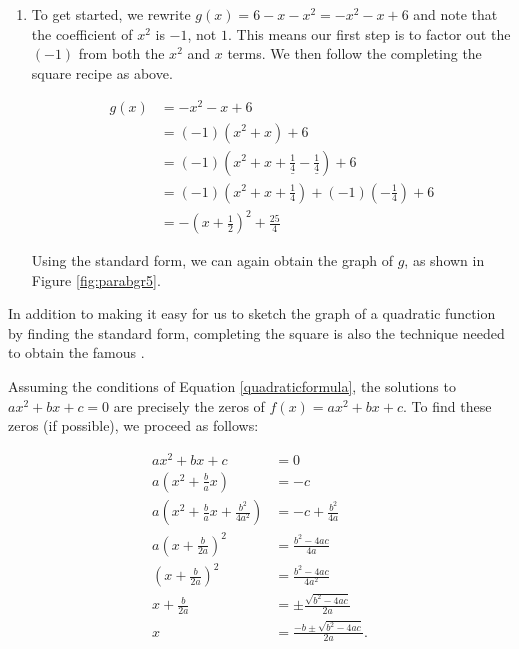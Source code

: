 {\begin{enumerate}
From the standard form we can immediately (if desired) produce a sketch of the graph of $f$,  as shown in Figure \ref{fig:parabgr4}.

\item  To get started, we rewrite $g(x) = 6-x-x^2 = -x^2-x+6$ and note that the coefficient of $x^2$ is $-1$, not $1$.  This means our first step is to factor out the $(-1)$ from both the $x^2$ and $x$ terms.  We then follow the completing the square recipe as above. 

\begin{align*}
g(x) & =  -x^2-x+6  \\
	   & = (-1)\left(x^2 + x \right) + 6  \tag*{(Factor the coefficient of $x^2$ from $x^2$ and $x$.)} \\
		 & = (-1)\left(x^2 + x + \underline{\frac{1}{4}} - \underline{\frac{1}{4}} \right) + 6  \\[3pt]
		 & =  (-1)\left(x^2 + x + \frac{1}{4}\right) + (-1)\left(-\frac{1}{4}\right) + 6  \tag*{(Group the perfect square trinomial.)}\\
		  & =  -\left(x +\frac{1}{2}\right)^2 + \frac{25}{4}
\end{align*}


Using the standard form, we can again obtain the graph of $g$, as shown in Figure \ref{fig:parabgr5}.  
\end{enumerate}
}

\medskip

In addition to making it easy for us to sketch the graph of a quadratic function by finding the standard form, completing the square is also the technique needed to obtain the famous  .

\smallskip


\smallskip

Assuming the conditions of Equation \ref{quadraticformula}, the solutions to $ax^2+bx+c = 0$ are precisely the zeros of $f(x) = ax^2 + bx + c$. To find these zeros (if possible), we proceed as follows:

\begin{align*}
ax^2+bx+c&=0\\
a\left(x^2+\frac{b}{a}x\right) & = -c\\[3pt]
a\left(x^2+\frac{b}{a}x+\frac{b^2}{4a^2}\right) & = -c+\frac{b^2}{4a}\\[3pt]
a\left(x+\frac{b}{2a}\right)^2 & = \frac{b^2-4ac}{4a}\\[3pt]
\left(x+\frac{b}{2a}\right)^2 & = \frac{b^2-4ac}{4a^2}\\[3pt]
x+\frac{b}{2a} & = \pm\frac{\sqrt{b^2-4ac}}{2a}\\[3pt]
x & = \frac{-b\pm\sqrt{b^2-4ac}}{2a}.
\end{align*}


